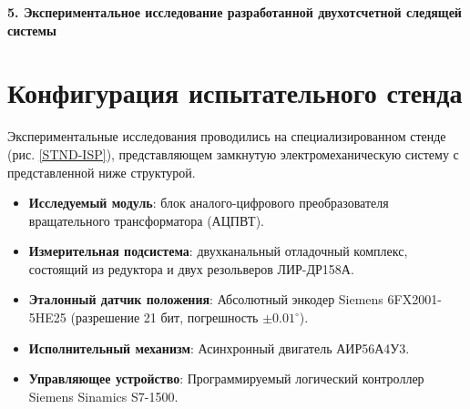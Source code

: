


\newpage

\noindent\textbf{\large 5.  Экспериментальное исследование разработанной двухотсчетной следящей системы}


\section{Конфигурация испытательного стенда}
Экспериментальные исследования проводились на специализированном стенде (рис. \ref{STND-ISP}), представляющем замкнутую электромеханическую систему 
с представленной ниже структурой.
\begin{itemize}
    \item \textbf{Исследуемый модуль}: блок аналого-цифрового преобразователя вращательного трансформатора (АЦПВТ).
    \item \textbf{Измерительная подсистема}: двухканальный отладочный комплекс, состоящий из редуктора и двух резольверов ЛИР-ДР158А.
    \item \textbf{Эталонный датчик положения}: Абсолютный энкодер Siemens \newline 6FX2001-5HE25 (разрешение 21 бит, погрешность $\pm0.01^\circ$).
    \item \textbf{Исполнительный механизм}: Асинхронный двигатель АИР56А4У3.
    \item \textbf{Управляющее устройство}: Программируемый логический контроллер Siemens Sinamics S7-1500.
\end{itemize}

